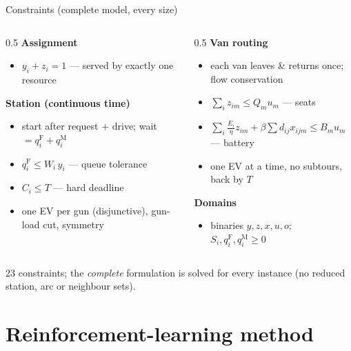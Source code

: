 \documentclass[aspectratio=169,11pt]{beamer}
\newcommand{\refline}[1]{{\scriptsize\color{black!55}\raggedright #1\par}}
\begin{document}
\begin{frame}{Constraints (complete model, every size)}
  {\footnotesize
  \begin{columns}[T]
    \begin{column}{0.5\textwidth}
      \textbf{Assignment}
      \begin{itemize}\item $y_i+z_i=1$ --- served by exactly one resource\end{itemize}
      \textbf{Station (continuous time)}
      \begin{itemize}
        \item start after request $+$ drive; wait $=q^{\mathrm F}_i+q^{\mathrm M}_i$
        \item $q^{\mathrm F}_i\le W_i\,y_i$ --- queue tolerance
        \item $C_i\le T$ --- hard deadline
        \item one EV per gun (disjunctive), gun-load cut, symmetry
      \end{itemize}
    \end{column}
    \begin{column}{0.5\textwidth}
      \textbf{Van routing}
      \begin{itemize}
        \item each van leaves \& returns once; flow conservation
        \item $\sum_i z_{im}\le Q_m u_m$ --- seats
        \item $\sum_i\tfrac{E_i}{\eta}z_{im}+\beta\!\sum d_{ij}x_{ijm}\le B_m u_m$ --- battery
        \item one EV at a time, no subtours, back by $T$
      \end{itemize}
      \textbf{Domains}
      \begin{itemize}\item binaries $y,z,x,u,o$;\ \ $S_i,q^{\mathrm F}_i,q^{\mathrm M}_i\ge0$\end{itemize}
    \end{column}
  \end{columns}}
  \vspace{3pt}
  \refline{23 constraints; the \emph{complete} formulation is solved for every instance (no reduced station, arc or neighbour sets).}
\end{frame}

\section{Reinforcement-learning method}
\end{document}
